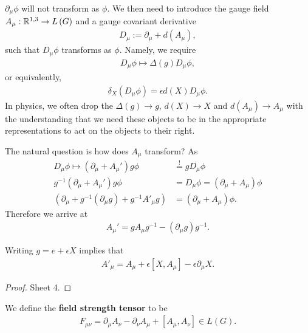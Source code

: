 \begin{note}
    $\partial_\mu \phi$ will not transform as $\phi$. We then need to introduce the gauge field $A_\mu : \mathbb{R}^{1,3} \to L \left( G \right) $ and a gauge covariant derivative
    \begin{align}
        D_\mu := \partial_\mu + d \left( A_\mu \right) 
    ,\end{align}
    such that $D_\mu \phi$ transforms as $\phi$. Namely, we require
    \begin{align}
        D_\mu \phi \mapsto \Delta \left( g \right) D_{\mu}\phi
    ,\end{align}
    or equivalently,
    \begin{align}
        \delta_X \left( D_\mu \phi \right) = \epsilon d\left( X \right) D_\mu \phi
    .\end{align}
    In physics, we often drop the $\Delta \left( g \right) \to g$, $d\left( X \right) \to X$ and $d \left( A_\mu \right) \to A_\mu$ with the understanding that we need these objects to be in the appropriate representations to act on the objects to their right.
\end{note}

The natural question is how does $A_\mu$ transform? As
\begin{align}
    D_\mu \phi \mapsto \left( \partial_\mu + A_{\mu}' \right) g \phi &\overset{!}{=} g D_{\mu}\phi \\
    g^{-1} \left( \partial_\mu + A_\mu'  \right) g \phi &= D_{\mu} \phi = \left( \partial_\mu + A_\mu \right) \phi \\
    \left( \partial_\mu + g^{-1} \left( \partial_\mu g \right) + g^{-1} A'_{\mu} g \right) &= \left( \partial_\mu + A_\mu \right)  \phi
.\end{align}
Therefore we arrive at
\begin{align}
    A_{\mu}' = g A_{\mu} g^{-1} - \left( \partial_\mu g \right) g^{-1}
.\end{align}

Writing $g = e + \epsilon X$ implies that 
\begin{align}
    A'_\mu = A_\mu + \epsilon \left[ X, A_\mu \right] - \epsilon \partial_\mu X
.\end{align}

\begin{proof}
    Sheet 4.
\end{proof}

\begin{definition}
    We define the \textbf{field strength tensor} to be
    \begin{align}
        F_{\mu \nu} = \partial_\mu A_\nu - \partial_\nu A_\mu + \left[ A_\mu, A_\nu \right]  \in L \left( G \right) 
    .\end{align}
\end{definition}

